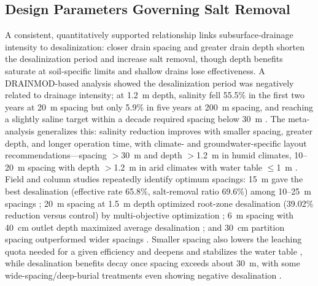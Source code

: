 \subsection{Design Parameters Governing Salt Removal}

A consistent, quantitatively supported relationship links subsurface-drainage intensity to desalinization: closer drain spacing and greater drain depth shorten the desalinization period and increase salt removal, though depth benefits saturate at soil-specific limits and shallow drains lose effectiveness. A DRAINMOD-based analysis showed the desalinization period was negatively related to drainage intensity; at 1.2~m depth, salinity fell 55.5\% in the first two years at 20~m spacing but only 5.9\% in five years at 200~m spacing, and reaching a slightly saline target within a decade required spacing below 30~m \parencite{Chen2025}. The meta-analysis generalizes this: salinity reduction improves with smaller spacing, greater depth, and longer operation time, with climate- and groundwater-specific layout recommendations---spacing $>$30~m and depth $>$1.2~m in humid climates, 10--20~m spacing with depth $>$1.2~m in arid climates with water table $\leq$1~m \parencite{Yang2025}. Field and column studies repeatedly identify optimum spacings: 15~m gave the best desalination (effective rate 65.8\%, salt-removal ratio 69.6\%) among 10--25~m spacings \parencite{Wang2020}; 20~m spacing at 1.5~m depth optimized root-zone desalination (39.02\% reduction versus control) by multi-objective optimization \parencite{Wang2025c}; 6~m spacing with 40~cm outlet depth maximized average desalination \parencite{Han2023}; and 30~cm partition spacing outperformed wider spacings \parencite{Chen2022}. Smaller spacing also lowers the leaching quota needed for a given efficiency and deepens and stabilizes the water table \parencite{Yang2022c}, while desalination benefits decay once spacing exceeds about 30~m, with some wide-spacing/deep-burial treatments even showing negative desalination \parencite{Zhu2025b}.

